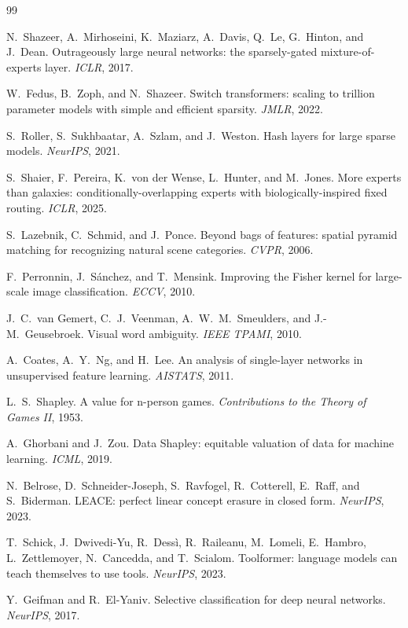 \documentclass[11pt]{article}
\begin{document}
\begin{thebibliography}{99}\small

N.~Shazeer, A.~Mirhoseini, K.~Maziarz, A.~Davis, Q.~Le, G.~Hinton,
and J.~Dean.
Outrageously large neural networks: the sparsely-gated
mixture-of-experts layer.
\emph{ICLR}, 2017.

W.~Fedus, B.~Zoph, and N.~Shazeer.
Switch transformers: scaling to trillion parameter models with
simple and efficient sparsity.
\emph{JMLR}, 2022.

S.~Roller, S.~Sukhbaatar, A.~Szlam, and J.~Weston.
Hash layers for large sparse models.
\emph{NeurIPS}, 2021.

S.~Shaier, F.~Pereira, K.~von der Wense, L.~Hunter, and
M.~Jones.
More experts than galaxies: conditionally-overlapping experts
with biologically-inspired fixed routing.
\emph{ICLR}, 2025.

S.~Lazebnik, C.~Schmid, and J.~Ponce.
Beyond bags of features: spatial pyramid matching for recognizing
natural scene categories.
\emph{CVPR}, 2006.

F.~Perronnin, J.~S\'anchez, and T.~Mensink.
Improving the Fisher kernel for large-scale image classification.
\emph{ECCV}, 2010.

J.~C.~van Gemert, C.~J.~Veenman, A.~W.~M.~Smeulders, and
J.-M.~Geusebroek.
Visual word ambiguity.
\emph{IEEE TPAMI}, 2010.

A.~Coates, A.~Y.~Ng, and H.~Lee.
An analysis of single-layer networks in unsupervised feature
learning.
\emph{AISTATS}, 2011.

L.~S.~Shapley.
A value for n-person games.
\emph{Contributions to the Theory of Games II}, 1953.

A.~Ghorbani and J.~Zou.
Data Shapley: equitable valuation of data for machine learning.
\emph{ICML}, 2019.

N.~Belrose, D.~Schneider-Joseph, S.~Ravfogel, R.~Cotterell,
E.~Raff, and S.~Biderman.
LEACE: perfect linear concept erasure in closed form.
\emph{NeurIPS}, 2023.

T.~Schick, J.~Dwivedi-Yu, R.~Dess\`i, R.~Raileanu, M.~Lomeli,
E.~Hambro, L.~Zettlemoyer, N.~Cancedda, and T.~Scialom.
Toolformer: language models can teach themselves to use tools.
\emph{NeurIPS}, 2023.

Y.~Geifman and R.~El-Yaniv.
Selective classification for deep neural networks.
\emph{NeurIPS}, 2017.


\end{thebibliography}
\end{document}
